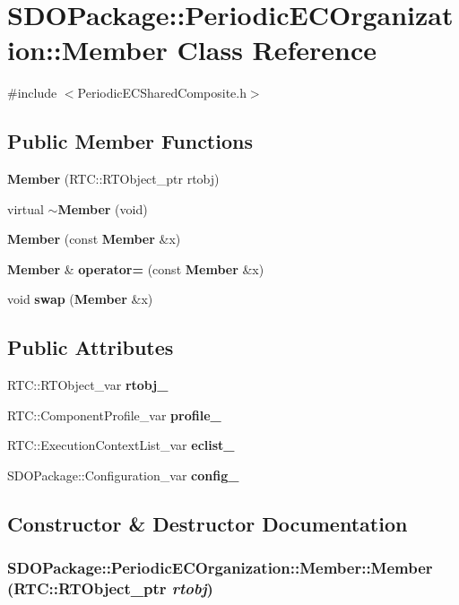 \section{SDOPackage::PeriodicECOrganization::Member Class Reference}
\label{classSDOPackage_1_1PeriodicECOrganization_1_1Member}


{\ttfamily \#include $<$PeriodicECSharedComposite.h$>$}

\subsection*{Public Member Functions}
\begin{DoxyCompactItemize}
\item 
{\bf Member} (RTC::RTObject\_\-ptr rtobj)
\item 
virtual {\bf $\sim$Member} (void)
\item 
{\bf Member} (const {\bf Member} \&x)
\item 
{\bf Member} \& {\bf operator=} (const {\bf Member} \&x)
\item 
void {\bf swap} ({\bf Member} \&x)
\end{DoxyCompactItemize}
\subsection*{Public Attributes}
\begin{DoxyCompactItemize}
\item 
RTC::RTObject\_\-var {\bf rtobj\_\-}
\item 
RTC::ComponentProfile\_\-var {\bf profile\_\-}
\item 
RTC::ExecutionContextList\_\-var {\bf eclist\_\-}
\item 
SDOPackage::Configuration\_\-var {\bf config\_\-}
\end{DoxyCompactItemize}


\subsection{Constructor \& Destructor Documentation}
\subsubsection[{Member}]{\setlength{\rightskip}{0pt plus 5cm}SDOPackage::PeriodicECOrganization::Member::Member (RTC::RTObject\_\-ptr {\em rtobj})\hspace{0.3cm}{\ttfamily  [inline]}}\label{classSDOPackage_1_1PeriodicECOrganization_1_1Member_ac2bb9e4a4943be8eac8d3ae10a281c0f}


